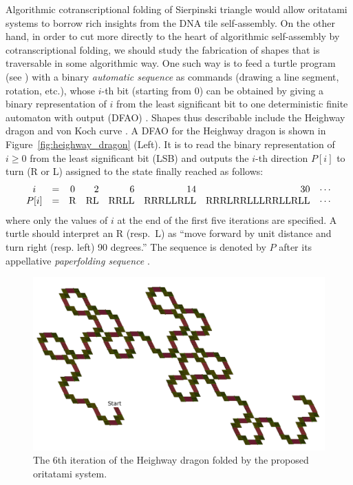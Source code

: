 Algorithmic cotranscriptional folding of Sierpinski triangle would allow oritatami systems to borrow rich insights from the DNA tile self-assembly. 
On the other hand, in order to cut more directly to the heart of algorithmic self-assembly by cotranscriptional folding, we should study the fabrication of shapes that is traversable in some algorithmic way. 
One such way is to feed a turtle program (see \cite{AbelsondiSessa1981}) with a binary \textit{automatic sequence} as commands (drawing a line segment, rotation, etc.), whose $i$-th bit (starting from 0) can be obtained by giving a binary representation of $i$ from the least significant bit to one deterministic finite automaton with output (DFAO) \cite{AlloucheShallit2003}.
Shapes thus describable include the Heighway dragon \cite{AlloucheShallit2003} and von Koch curve \cite{MaHoldener2005}. 
A DFAO for the Heighway dragon is shown in Figure~\ref{fig:heighway_dragon} (Left). 
It is to read the binary representation of $i \ge 0$ from the least significant bit (LSB) and outputs the $i$-th direction $P[i]$ to turn (R or L) assigned to the state finally reached as follows: 
\[
\begin{array}{cccrrrrc}
i 	&=& 0 &  2 & 6 & 14 & 30 & \cdots \\
P[i] 	&=& {\rm R} & {\rm RL} & {\rm RRLL} & {\rm RRRLLRLL} & {\rm RRRLRRLLLRRLLRLL} & \cdots
\end{array}
\]
where only the values of $i$ at the end of the first five iterations are specified. 
A turtle should interpret an R (resp.~L) as ``move forward by unit distance and turn right (resp. left) 90 degrees.''
The sequence is denoted by $P$ after its appellative \textit{paperfolding sequence} \cite{AlloucheShallit2003}. 

\begin{figure}[htb]
\centering
\includegraphics[width=\linewidth]{pic/6bit_heighway.pdf}
\caption{The 6th iteration of the Heighway dragon folded by the proposed oritatami system.}
\label{fig:heighway6_oritatami}
\end{figure}

